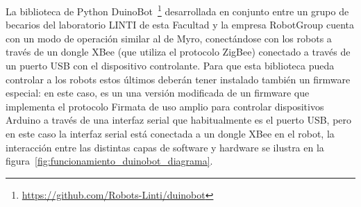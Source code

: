 La biblioteca de Python
DuinoBot~\footnote{\url{https://github.com/Robots-Linti/duinobot}}
desarrollada en conjunto entre un grupo
de becarios del laboratorio LINTI de esta Facultad y la empresa RobotGroup
cuenta con un modo de operación similar al de Myro, conectándose con
los robots a través de un dongle XBee (que utiliza el protocolo ZigBee)
conectado a través de un puerto USB con el dispositivo controlante.
Para que esta biblioteca pueda controlar a los robots estos últimos
deberán tener instalado también un firmware especial: en este caso,
es un una versión modificada de un firmware que implementa el protocolo
Firmata de uso amplio para controlar dispositivos Arduino a través de una
interfaz serial que habitualmente es el puerto USB, pero en este caso
la interfaz serial está conectada a un dongle XBee en el robot, la interacción
entre las distintas capas de software y hardware se ilustra en la
figura~\ref{fig:funcionamiento_duinobot_diagrama}.

